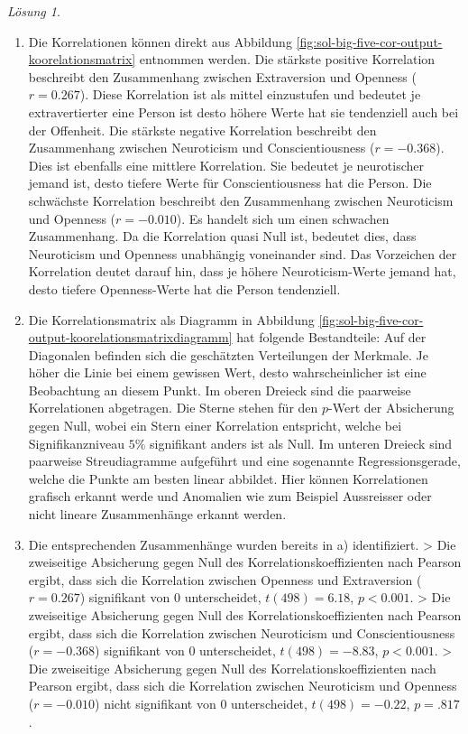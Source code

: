 \documentclass[
]{book}
\providecommand{\tightlist}{%
  \setlength{\itemsep}{0pt}\setlength{\parskip}{0pt}}
\theoremstyle{definition}
\theoremstyle{definition}
\theoremstyle{definition}
\theoremstyle{definition}
\theoremstyle{remark}
\newtheorem*{solution}{Lösung}
\begin{document}
\begin{solution}
\begin{enumerate}
\def\labelenumi{\alph{enumi})}
\tightlist
\item
  Die Korrelationen können direkt aus Abbildung \ref{fig:sol-big-five-cor-output-koorelationsmatrix} entnommen werden. Die stärkste positive Korrelation beschreibt den Zusammenhang zwischen Extraversion und Openness (\(r = 0.267\)). Diese Korrelation ist als mittel einzustufen und bedeutet je extravertierter eine Person ist desto höhere Werte hat sie tendenziell auch bei der Offenheit. Die stärkste negative Korrelation beschreibt den Zusammenhang zwischen Neuroticism und Conscientiousness (\(r = -0.368\)). Dies ist ebenfalls eine mittlere Korrelation. Sie bedeutet je neurotischer jemand ist, desto tiefere Werte für Conscientiousness hat die Person. Die schwächste Korrelation beschreibt den Zusammenhang zwischen Neuroticism und Openness (\(r = -0.010\)). Es handelt sich um einen schwachen Zusammenhang. Da die Korrelation quasi Null ist, bedeutet dies, dass Neuroticism und Openness unabhängig voneinander sind. Das Vorzeichen der Korrelation deutet darauf hin, dass je höhere Neuroticism-Werte jemand hat, desto tiefere Openness-Werte hat die Person tendenziell.
\item
  Die Korrelationsmatrix als Diagramm in Abbildung \ref{fig:sol-big-five-cor-output-koorelationsmatrixdiagramm} hat folgende Bestandteile: Auf der Diagonalen befinden sich die geschätzten Verteilungen der Merkmale. Je höher die Linie bei einem gewissen Wert, desto wahrscheinlicher ist eine Beobachtung an diesem Punkt. Im oberen Dreieck sind die paarweise Korrelationen abgetragen. Die Sterne stehen für den \(p\)-Wert der Absicherung gegen Null, wobei ein Stern einer Korrelation entspricht, welche bei Signifikanzniveau \(5\%\) signifikant anders ist als Null. Im unteren Dreieck sind paarweise Streudiagramme aufgeführt und eine sogenannte Regressionsgerade, welche die Punkte am besten linear abbildet. Hier können Korrelationen grafisch erkannt werde und Anomalien wie zum Beispiel Aussreisser oder nicht lineare Zusammenhänge erkannt werden.
\item
  Die entsprechenden Zusammenhänge wurden bereits in a) identifiziert.
  \textgreater{} Die zweiseitige Absicherung gegen Null des Korrelationskoeffizienten nach Pearson ergibt, dass sich die Korrelation zwischen Openness und Extraversion (\(r = 0.267\)) signifikant von \(0\) unterscheidet, \(t(498) = 6.18\), \(p < 0.001\).
  \textgreater{} Die zweiseitige Absicherung gegen Null des Korrelationskoeffizienten nach Pearson ergibt, dass sich die Korrelation zwischen Neuroticism und Conscientiousness (\(r = -0.368\)) signifikant von \(0\) unterscheidet, \(t(498) = -8.83\), \(p < 0.001\).
  \textgreater{} Die zweiseitige Absicherung gegen Null des Korrelationskoeffizienten nach Pearson ergibt, dass sich die Korrelation zwischen Neuroticism und Openness (\(r = -0.010\)) nicht signifikant von \(0\) unterscheidet, \(t(498) = -0.22\), \(p = .817\).
\end{enumerate}

\end{solution}
\end{document}
